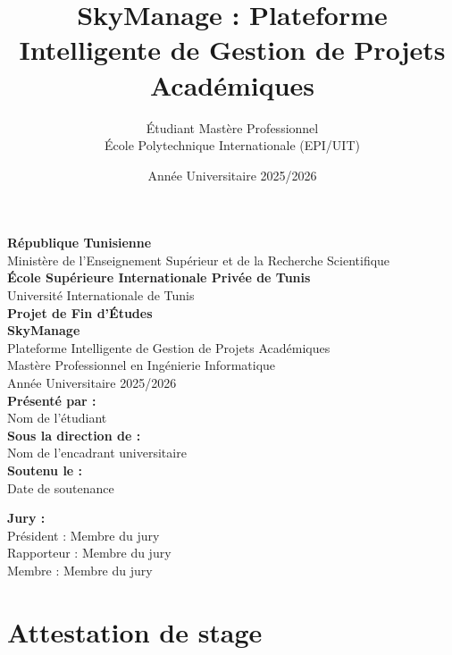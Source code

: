 \documentclass[12pt,a4paper]{report}
\title{SkyManage : Plateforme Intelligente de Gestion de Projets Académiques}
\author{Étudiant Mastère Professionnel\\École Polytechnique Internationale (EPI/UIT)}
\date{Année Universitaire 2025/2026}
\begin{document}
\begin{titlepage}
    \centering
    \vspace*{2cm}
    
    {\LARGE\bfseries République Tunisienne}\\[0.5cm]
    {\large Ministère de l'Enseignement Supérieur et de la Recherche Scientifique}\\[1cm]
    
    {\Large\bfseries École Supérieure Internationale Privée de Tunis}\\[0.5cm]
    {\Large Université Internationale de Tunis}\\[2cm]
    
    {\Huge\bfseries Projet de Fin d'Études}\\[1cm]
    {\LARGE\bfseries SkyManage}\\[0.5cm]
    {\large Plateforme Intelligente de Gestion de Projets Académiques}\\[2cm]
    
    {\large Mastère Professionnel en Ingénierie Informatique}\\[0.5cm]
    {\large Année Universitaire 2025/2026}\\[2cm]
    
    {\large\bfseries Présenté par :}\\[0.5cm]
    {\large Nom de l'étudiant}\\[1cm]
    
    {\large\bfseries Sous la direction de :}\\[0.5cm]
    {\large Nom de l'encadrant universitaire}\\[1cm]
    
    {\large\bfseries Soutenu le :}\\[0.5cm]
    {\large Date de soutenance}
    
    \vfill
    
    {\large\bfseries Jury :}\\[0.5cm]
    {\large Président : Membre du jury}\\[0.3cm]
    {\large Rapporteur : Membre du jury}\\[0.3cm]
    {\large Membre : Membre du jury}
\end{titlepage}

\newpage
\thispagestyle{empty}
\mbox{}

\newpage
\chapter*{Attestation de stage}
\end{document}
